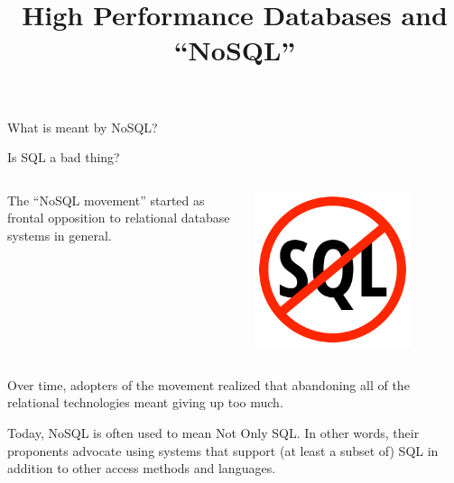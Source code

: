 \documentclass[xcolor={usenames,dvipsnames}
    ,handout
]{beamer}
\title{High Performance Databases and ``NoSQL''}
\begin{document}
\frame{\maketitle}

\begin{frame}{What is meant by NoSQL?}

\begin{block}{Is SQL a bad thing?}
\begin{columns}[onlytextwidth]
\begin{column}{0.75\textwidth}
The ``NoSQL movement'' started as frontal opposition to relational database systems in general. 
\end{column}
\begin{column}{0.25\textwidth}
\begin{center}
\includegraphics[width=0.75\textwidth]{./figures/noSQL.pdf}
\end{center}
\end{column}
\end{columns}
\end{block}

Over time, adopters of the movement realized that abandoning all of the relational technologies meant giving up too much.

Today, NoSQL is often used to mean \alert{Not Only} SQL. In other words, their proponents advocate using systems that support (at least a subset of) SQL in addition to other access methods and languages.

\end{frame}
\end{document}

